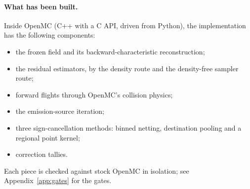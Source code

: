 \documentclass[11pt]{article}
\theoremstyle{definition}
\begin{document}
\paragraph{What has been built.} Inside OpenMC (C++ with a C API, driven from Python), the
implementation has the following components:
\begin{itemize}
\item the frozen field and its backward-characteristic reconstruction;
\item the residual estimators, by the density route and the density-free sampler route;
\item forward flights through OpenMC's collision physics;
\item the emission-source iteration;
\item three sign-cancellation methods: binned netting, destination pooling and a regional point
  kernel;
\item correction tallies.
\end{itemize}
Each piece is checked against stock OpenMC in isolation; see Appendix~\ref{app:gates} for the gates.
\end{document}
